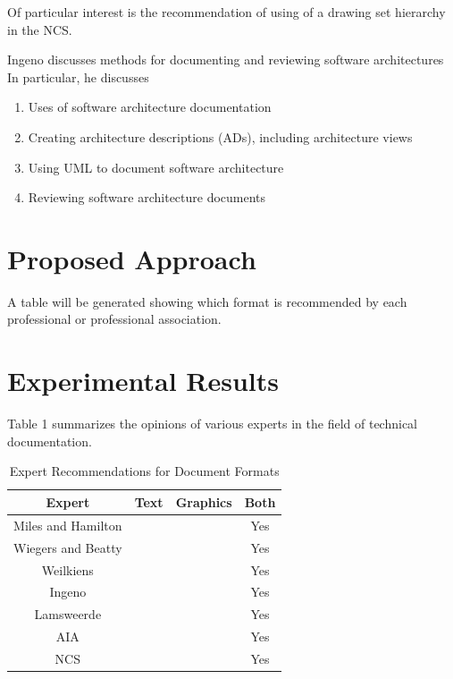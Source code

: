 \documentclass{acm_proc_article-sp}
\begin{document}
Of particular interest is the recommendation of using of a drawing set hierarchy in the NCS.  

Ingeno discusses methods for documenting and reviewing software architectures \cite{Lamport:SoftwareArchitectureHandbook} In particular, he discusses
\begin{enumerate}
	\item Uses of software architecture documentation
	\item Creating architecture descriptions (ADs), including architecture views
	\item Using UML to document software architecture
	\item Reviewing software architecture documents
\end{enumerate}

\section{Proposed Approach}
A table will be generated showing which format is recommended by each professional or professional association.

\section{Experimental Results}
Table 1 summarizes the opinions of various experts in the field of technical documentation.
\begin{table}[ht]
	\caption{Expert Recommendations for Document Formats} %
	\centering %
	\begin{tabular}{c c c c} %
		\hline\hline %
		Expert & Text & Graphics & Both \\ [0.5ex] %
		\hline %
		Miles and Hamilton \cite{Lamport:UML} &  &  & Yes \\ %
		Wiegers and Beatty \cite{Lamport:SoftwareRequirements} &  &  & Yes \\
		Weilkiens \cite{Lamport:SysML} &  &  & Yes \\
		Ingeno \cite{Lamport:SoftwareArchitectureHandbook} &  &  & Yes \\
		Lamsweerde \cite{Lamport:RequirementsEngineering} &  &  & Yes \\
		AIA \cite{Lamport:AIA_Graphical_Standards} &  &  & Yes \\
		NCS \cite{NCS} &  &  & Yes \\ [1ex] %
		\hline %
	\end{tabular}
	\label{table:nonlin} %
\end{table}
\end{document}
